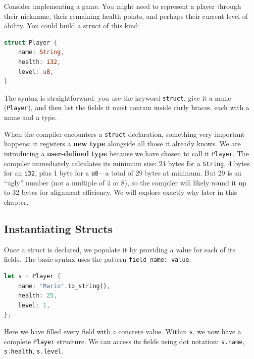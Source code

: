 Consider implementing a game. You might need to represent a player through their nickname, their remaining health points, and perhaps their current level of ability. You could build a struct of this kind:

\begin{lstlisting}[language=Rust]
struct Player {
    name: String,
    health: i32,
    level: u8,
}
\end{lstlisting}

The syntax is straightforward: you use the keyword \texttt{struct}, give it a name (\texttt{Player}), and then list the fields it must contain inside curly braces, each with a name and a type.

\begin{insightbox}
When the compiler encounters a \texttt{struct} declaration, something very important happens: it registers a \textbf{new type} alongside all those it already knows. We are introducing a \textbf{user-defined type} because we have chosen to call it \texttt{Player}. The compiler immediately calculates its minimum size: 24 bytes for a \texttt{String}, 4 bytes for an \texttt{i32}, plus 1 byte for a \texttt{u8}---a total of 29 bytes at minimum. But 29 is an ``ugly'' number (not a multiple of 4 or 8), so the compiler will likely round it up to 32 bytes for alignment efficiency. We will explore exactly why later in this chapter.
\end{insightbox}

\subsection{Instantiating Structs}

Once a struct is declared, we populate it by providing a value for each of its fields. The basic syntax uses the pattern \texttt{field\_name: value}:

\begin{lstlisting}[language=Rust]
let s = Player {
    name: "Mario".to_string(),
    health: 25,
    level: 1,
};
\end{lstlisting}

Here we have filled every field with a concrete value. Within \texttt{s}, we now have a complete \texttt{Player} structure. We can access its fields using dot notation: \texttt{s.name}, \texttt{s.health}, \texttt{s.level}.

